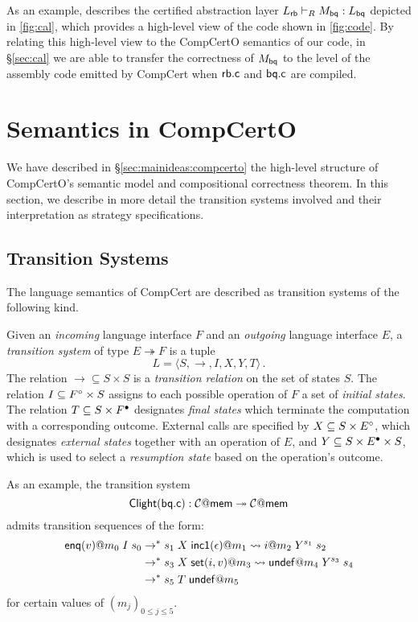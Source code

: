 \documentclass[sigplan,10pt,authordraft]{acmart}
\begin{document}
As an example,
\citet{rbgs-cal} describes the certified abstraction layer
$L_{ \mathsf{rb} } \vdash_R M_{ \mathsf{bq} } : L_{ \mathsf{bq} }$
depicted in \autoref{fig:cal},
which provides a high-level view
of the code shown in \autoref{fig:code}.
By relating this high-level view
to the CompCertO semantics of our code,
in \S\ref{sec:cal} we are able to transfer
the correctness of $M_{ \mathsf{bq} }$
to the level of the assembly code emitted by CompCert
when $ \mathsf{rb.c} $ and $ \mathsf{bq.c} $ are compiled.


\section{Semantics in CompCertO} \label{sec:compcerto} %

We have described in \S\ref{sec:mainideas:compcerto}
the high-level structure
of CompCertO's semantic model
and compositional correctness theorem.
In this section,
we describe in more detail
the transition systems involved
and their interpretation 
as strategy specifications.

\subsection{Transition Systems} %

The language semantics of CompCert are described
as transition systems of the following kind.

\begin{definition}
Given an \emph{incoming} language interface $F$
and an \emph{outgoing} language interface $E$,
a \emph{transition system} of type $E \twoheadrightarrow F$
is a tuple \[ L = \langle S, \rightarrow, I, X, Y, T \rangle \,. \]
The relation
${\rightarrow} \subseteq S \times S$ is
a \emph{transition relation} on the set of states $S$.
The relation
$I \subseteq F^\circ \times S$ 
assigns to each possible operation of $F$
a set of \emph{initial states}.
The relation
$T \subseteq S \times F^\bullet$
designates \emph{final states}
which terminate the computation with a corresponding outcome.
External calls are specified by
$X \subseteq S \times E^\circ$,
which designates \emph{external states} together with
an operation of $E$, and
$Y \subseteq S \times E^\bullet \times S$,
which is used to select a \emph{resumption state}
based on the operation's outcome.
\end{definition}

\noindent
As an example,
the transition system
\[
  \mathsf{Clight} ( \mathsf{bq.c} ) :
 \mathcal{C}@ \mathsf{mem}  \twoheadrightarrow \mathcal{C}@ \mathsf{mem} 
\]
admits transition sequences of the form:
{ \small
\begin{align*}
   \mathsf{enq} (v)@m_0 \mathrel{I}
  s_0 &\rightarrow^*
  s_1 \mathrel{X}
   \mathsf{inc1} (\epsilon)@m_1 \leadsto
  i@m_2 \mathrel{Y^{s_1}}
  s_2 \\&\rightarrow^*
  s_3 \mathrel{X}
   \mathsf{set} (i, v)@m_3 \leadsto
   \mathsf{undef} @m_4 \mathrel{Y^{s_3}}
  s_4 \\&\rightarrow^*
  s_5 \mathrel{T}
   \mathsf{undef} @m_5
\end{align*}}
for certain values of $(m_j)_{0 \le j \le 5}$.
\end{document}
